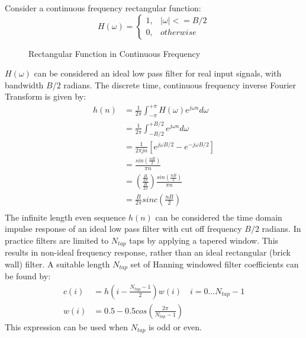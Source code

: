 \documentclass{article}
\begin{document}
Consider a continuous frequency rectangular function:
\begin{equation} \label{eq:h_omega}
H(\omega)= 
	\begin{cases}
      1, & |\omega| <= B/2 \\
      0, & otherwise
	\end{cases}
\end{equation}

\begin{figure}[h]
\caption{Rectangular Function in Continuous Frequency}
\vspace{5mm}
\label{fig:rect_freq}
\centering
{}
\end{figure}

$H(\omega)$ can be considered an ideal low pass filter for real input signals, with bandwidth $B/2$ radians. The discrete time, continuous frequency inverse Fourier Transform is given by:
\begin{equation} \label{eq:dtcf_1}
\begin{split}
h(n) &= \frac{1}{2 \pi} \int_{-\pi}^{+\pi} H(\omega )e^{j \omega n} d\omega \\
     &= \frac{1}{2 \pi} \int_{-B/2}^{+B/2} e^{j \omega n} d\omega \\
     &= \frac{1}{2 \pi jn} \left[ e^{j \omega B/2} - e^{-j \omega B/2} \right] \\
     &= \frac{sin \left( \frac{nB}{2} \right) }{\pi n} \\
     &= \left( \frac{\frac{B}{2 \pi}}{\frac{B}{2 \pi}} \right ) \frac{sin \left( \frac{nB}{2} \right) }{\pi n} \\
     &= \frac{B}{2 \pi} sinc \left( \frac{nB}{2} \right) \\
\end{split}
\end{equation}
The infinite length even sequence $h(n)$ can be considered the time domain impulse response of an ideal low pass filter with cut off frequency $B/2$ radians. In practice filters are limited to $N_{tap}$ taps by applying a tapered window.  This results in non-ideal frequency response, rather than an ideal rectangular (brick wall) filter. A suitable length $N_{tap}$ set of Hanning windowed filter coefficients can be found by:
\begin{equation}
\begin{split}
c(i) &= h \left( i-\frac{N_{tap}-1}{2} \right) w(i) \quad i=0 \ldots N_{tap}-1 \\
w(i) &= 0.5 - 0.5cos \left( \frac{2 \pi}{N_{tap}-1} \right)
\end{split}
\end{equation}
This expression can be used when $N_{tap}$ is odd or even.
\end{document}
